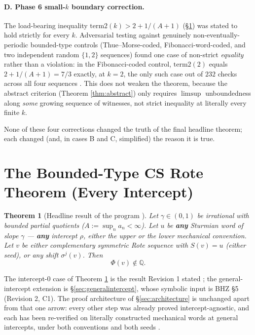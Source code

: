 \documentclass[11pt]{article}
\newtheorem{theorem}{Theorem}[section]
\newcommand{\Q}{\mathbb{Q}}
\begin{document}
\paragraph{D. Phase 6 small-$k$ boundary correction.} The load-bearing inequality $\text{term2}(k)>2+1/(A+1)$ (\S\ref{sec:boundedtype}) was stated to hold strictly for every $k$. Adversarial testing against genuinely non-eventually-periodic bounded-type controls (Thue--Morse-coded, Fibonacci-word-coded, and two independent random $\{1,2\}$ sequences) found one case of non-strict \emph{equality} rather than a violation: in the Fibonacci-coded control, $\text{term2}(2)$ equals $2+1/(A+1)=7/3$ exactly, at $k=2$, the only such case out of $232$ checks across all four sequences \cite{Phase6Arrow}. This does not weaken the theorem, because the abstract criterion (Theorem \ref{thm:abstract}) only requires $\limsup$ unboundedness along \emph{some} growing sequence of witnesses, not strict inequality at literally every finite $k$.

None of these four corrections changed the truth of the final headline theorem; each changed (and, in cases B and C, simplified) the reason it is true.

\section{The Bounded-Type CS Rote Theorem (Every Intercept)}
\label{sec:boundedtype}

\begin{theorem}[Headline result of the program \cite{Phase8Proof}]
\label{thm:boundedtype}
Let $\gamma\in(0,1)$ be irrational with bounded partial quotients ($A:=\sup_n a_n<\infty$). Let $u$
be \textbf{any} Sturmian word of slope $\gamma$ --- \textbf{any} intercept $\rho$, either the upper
or the lower mechanical convention. Let $v$ be either complementary symmetric Rote sequence with
$S(v)=u$ (either seed), or any shift $\sigma^j(v)$. Then
\[
\Phi(v)\notin\Q.
\]
\end{theorem}

The intercept-$0$ case of Theorem \ref{thm:boundedtype} is the result Revision 1 stated
\cite{Phase6Bounded}; the general-intercept extension is \S\ref{sec:generalintercept}, whose
symbolic input is BHZ \cite{BHZ2006} \S5 (Revision 2, C1). The proof architecture of
\S\ref{sec:architecture} is unchanged apart from that one arrow: every other step was already
proved intercept-agnostic, and each has been re-verified on literally constructed mechanical words
at general intercepts, under both conventions and both seeds \cite{Phase8Chain}.
\end{document}
